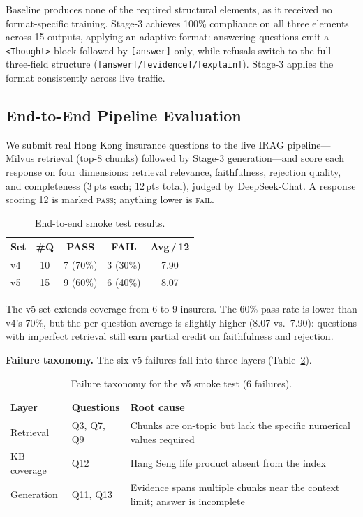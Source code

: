 \documentclass[10pt,conference]{IEEEtran}
\begin{document}
Baseline produces none of the required structural elements, as it received no
format-specific training.
Stage-3 achieves 100\% compliance on all three elements across 15 outputs,
applying an adaptive format: answering questions emit a \texttt{<Thought>}
block followed by \texttt{[answer]} only, while refusals switch to the full
three-field structure (\texttt{[answer]/[evidence]/[explain]}).
Stage-3 applies the format consistently across live traffic.

\subsection{End-to-End Pipeline Evaluation}
\label{sec:e2e}

We submit real Hong Kong insurance questions to the live IRAG
pipeline---Milvus retrieval (top-8 chunks) followed by Stage-3
generation---and score each response on four dimensions: retrieval relevance,
faithfulness, rejection quality, and completeness (3\,pts each; 12\,pts total),
judged by DeepSeek-Chat.
A response scoring 12 is marked \textsc{pass}; anything lower is
\textsc{fail}.

\begin{table}[htbp]
\centering
\caption{End-to-end smoke test results.}
\label{tab:smoke}
\small
\begin{tabular}{@{}lcccc@{}}
\toprule
Set & \#Q & PASS & FAIL & Avg\,/\,12 \\
\midrule
v4 & 10 & 7 (70\%) & 3 (30\%) & 7.90 \\
v5 & 15 & 9 (60\%) & 6 (40\%) & 8.07 \\
\bottomrule
\end{tabular}
\end{table}

The v5 set extends coverage from 6 to 9 insurers.
The 60\% pass rate is lower than v4's 70\%, but the per-question average is
slightly higher (8.07 vs.\ 7.90): questions with imperfect retrieval still earn
partial credit on faithfulness and rejection.

\noindent\textbf{Failure taxonomy.}
The six v5 failures fall into three layers (Table~\ref{tab:failures}).

\begin{table}[htbp]
\centering
\caption{Failure taxonomy for the v5 smoke test (6 failures).}
\label{tab:failures}
\small
\begin{tabular}{@{}p{1.3cm}p{1.2cm}p{4.5cm}@{}}
\toprule
Layer & Questions & Root cause \\
\midrule
Retrieval & Q3, Q7, Q9 & Chunks are on-topic but lack the specific numerical values required \\
KB coverage & Q12 & Hang Seng life product absent from the index \\
Generation & Q11, Q13 & Evidence spans multiple chunks near the context limit; answer is incomplete \\
\bottomrule
\end{tabular}
\end{table}
\end{document}
